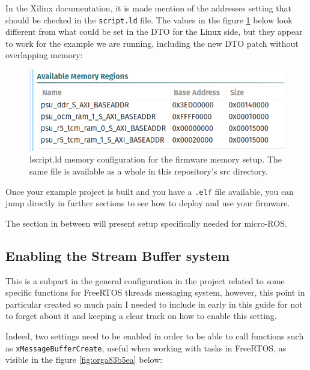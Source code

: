 \documentclass[10pt]{article}
\begin{document}
\pagebreak
In the Xilinx documentation, it is made mention of the addresses setting that should be checked in the \texttt{script.ld} file.
The values in the figure \ref{fig:orgfb60c17} below look different from what could be set in the DTO for the Linux side, but they appear to
work for the example we are running, including the new DTO patch without overlapping memory:


\begin{figure}[htbp]
\centering
\includegraphics[width=.6\textwidth]{./img/vitis_new/project_mem.png}
\caption{\label{fig:orgfb60c17}lscript.ld memory configuration for the firmware memory setup. The same file is available as a whole in this repository's src directory.}
\end{figure}


Once your example project is built and you have a \texttt{.elf} file available, you can
jump directly in further sections to see how to deploy and use your firmware.

The section in between will present setup specifically needed for micro-ROS.

\subsection{Enabling the Stream Buffer system}
\label{sec:org2714f30}
This is a subpart in the general configuration in the project related to some specific
functions for FreeRTOS threads messaging system, however, this point in particular
created so much pain I needed to include in early in this guide for not to forget about it
and keeping a clear track on how to enable this setting.

Indeed, two settings need to be enabled in order to be able to call
functions such as \texttt{xMessageBufferCreate}, useful when working with tasks
in FreeRTOS, as visible in the figure \ref{fig:orga83b5ea} below:
\end{document}
